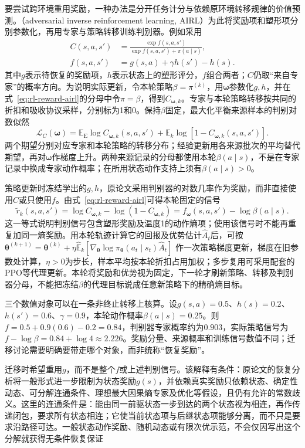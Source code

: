 要尝试跨环境重用奖励，一种办法是分开任务计分与依赖原环境转移规律的价值预测。（adversarial inverse reinforcement learning, AIRL）为此将奖励项和塑形项分别参数化，再用专家与策略转移训练判别器。例如采用
\begin{equation}
  \begin{aligned}
    C(s,a,s')&=\frac{\exp f(s,a,s')}
                         {\exp f(s,a,s')+\pi(a\mid s)},\\
    f(s,a,s')&=g(s,a)+\gamma h(s')-h(s).
  \end{aligned}
  \label{eq:rl-reward-airl}
\end{equation}
其中$g$表示待恢复的奖励项，$h$表示状态上的塑形评分，$f$组合两者；$C$仍取“来自专家”的概率方向。为说明实际更新，令本轮策略$\beta=\pi^{(k)}$，用$\bm\omega$参数化$g,h$，并在式~\eqref{eq:rl-reward-airl}的分母中令$\pi=\beta$，得到$C_{\bm\omega,k}$。专家与本轮策略转移按共同的折扣和吸收协议采样，分别标为1和0。保持$\beta$固定，最大化平衡来源样本的判别对数似然
\[
  \mathcal L_C(\bm\omega)
  =\mathbb E_{\mathrm E}\log C_{\bm\omega,k}(s,a,s')
    +\mathbb E_k\log[1-C_{\bm\omega,k}(s,a,s')] .
\]
两个期望分别对应专家和本轮策略的转移分布；经验更新用各来源批次的平均替代期望，再对$\bm\omega$作梯度上升。两种来源记录的分母都使用本轮$\beta(a\mid s)$，不是在专家记录中换成专家动作概率；在所用状态动作支持上须有$\beta(a\mid s)>0$。

策略更新时冻结学出的$g,h$，原论文采用判别器的对数几率作为奖励，而非直接使用$C$或只使用$f$。由式~\eqref{eq:rl-reward-airl}可得本轮固定的信号
\[
  \widetilde r_k(s,a,s')
  =\log C_{\bm\omega,k}-\log(1-C_{\bm\omega,k})
  =f_{\bm\omega}(s,a,s')-\log\beta(a\mid s).
\]
这一等式说明判别信号包含塑形奖励及温度1的动作熵项；使用该信号时不能再重复加同一熵奖励。用本轮轨迹计算它的回报及优势估计$\widehat A_t$后，可按
$\bm\theta^{(k+1)}=\bm\theta^{(k)}
+\eta\widehat{\mathbb E}_k[
\nabla_{\bm\theta}\log\pi_{\bm\theta}(a_t\mid s_t)\widehat A_t]$
作一次策略梯度更新，梯度在旧参数处计算，$\eta>0$为步长，样本平均按本轮折扣占用加权；多步复用可采用配套的PPO等代理更新。本轮将奖励和优势视为固定，下一轮才刷新策略、转移及判别器分母，不能把冻结$\beta$的代理目标说成任意新策略下的精确熵目标。

三个数值对象可以在一条非终止转移上核算。设$g(s,a)=0.5$、$h(s)=0.2$、$h(s')=0.6$、$\gamma=0.9$，本轮动作概率$\beta(a\mid s)=0.25$。则$f=0.5+0.9(0.6)-0.2=0.84$，判别器专家概率约为$0.903$，实际策略信号为$f-\log\beta=0.84+\log4\approx2.226$。奖励分量、来源概率和训练信号数值不同；迁移讨论需要明确要带走哪个对象，而非统称“恢复奖励”。

迁移时希望重用$g$，而不是整个$f$或上述判别信号。该解释有条件：原论文的恢复分析将一般形式进一步限制为状态奖励$g(s)$，并依赖真实奖励只依赖状态、确定性动态、可分解连通条件、理想最大因果熵专家及优化等假设，且仍有允许的常数歧义。这里的连通条件是：能由同一前驱状态一步到达的两个状态视为相连，再作传递闭包，要求所有状态相连；它使当前状态项与后继状态项能够分离，而不只是要求沿路径可达。一般状态动作奖励、随机动态或有限次优示范，不会仅因写出这个分解就获得无条件恢复保证

